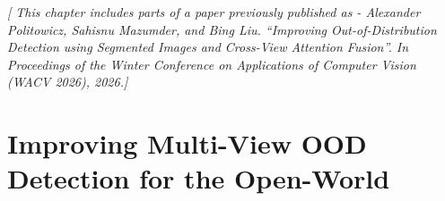 
\textit{[ This chapter includes parts of a paper previously published as - Alexander Politowicz, Sahisnu Mazumder, and Bing Liu. “Improving Out-of-Distribution Detection using Segmented Images and Cross-View Attention Fusion”. In Proceedings of the Winter Conference on Applications of Computer Vision (WACV 2026), 2026.]}

\section{Improving Multi-View OOD Detection for the Open-World}
\label{sec:propwork-casod}

